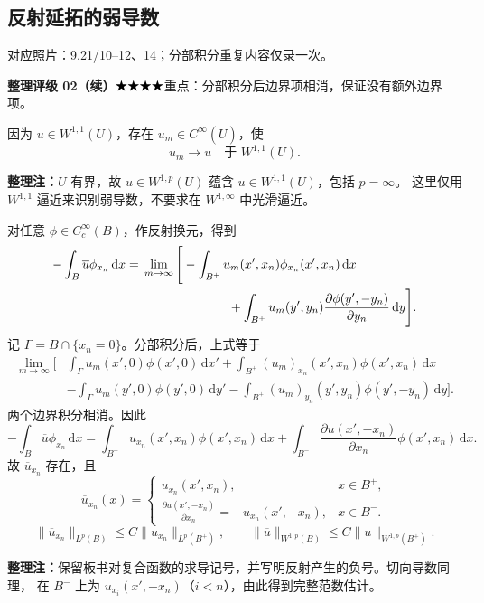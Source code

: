 \documentclass[UTF8,a4paper,11pt,fontset=fandol]{ctexart}
\newcommand{\dd}{\,\mathrm d}
\newcommand{\ednote}[1]{\par{\small\color{notegray}\textbf{整理注：}#1}\par}
\newcommand{\source}[1]{{\small\color{notegray}对应照片：#1。}\par}
\newcommand{\proofstars}[1]{\ensuremath{%
\ifnum#1>0\relax\bigstar\fi
\ifnum#1>1\relax\bigstar\fi
\ifnum#1>2\relax\bigstar\fi
\ifnum#1>3\relax\bigstar\fi
\ifnum#1>4\relax\bigstar\fi}}
\newcommand{\proofrating}[3]{\par{\small\color{proofblue}%
\textbf{整理评级 #1}\enspace\proofstars{#2}\quad #3\par}}
\begin{document}
\subsection*{反射延拓的弱导数}
\source{9.21/10--12、14；分部积分重复内容仅录一次}
\proofrating{02（续）}{4}{重点：分部积分后边界项相消，保证没有额外边界项。}
因为 $u\in W^{1,1}(U)$，存在 $u_m\in C^\infty(\overline U)$，使
\[
u_m\longrightarrow u\quad\text{于 }W^{1,1}(U).
\]
\ednote{$U$ 有界，故 $u\in W^{1,p}(U)$ 蕴含 $u\in W^{1,1}(U)$，包括 $p=\infty$。
这里仅用 $W^{1,1}$ 逼近来识别弱导数，不要求在 $W^{1,\infty}$ 中光滑逼近。}
对任意 $\phi\in C_c^\infty(B)$，作反射换元，得到
\[
\begin{aligned}
-\int_B\overline u\phi_{x_n}\dd x
={}&\lim_{m\to\infty}\Bigg[
-\int_{B^+}u_m(x',x_n)\phi_{x_n}(x',x_n)\dd x\\
&\hspace{24mm}+\int_{B^+}u_m(y',y_n)
\frac{\partial\phi(y',-y_n)}{\partial y_n}\dd y\Bigg].
\end{aligned}
\]
记 $\Gamma=B\cap\{x_n=0\}$。分部积分后，上式等于
\[
\begin{aligned}
\lim_{m\to\infty}\Bigg[{}
&\int_\Gamma u_m(x',0)\phi(x',0)\dd x'
+\int_{B^+}(u_m)_{x_n}(x',x_n)\phi(x',x_n)\dd x\\
&-\int_\Gamma u_m(y',0)\phi(y',0)\dd y'
-\int_{B^+}(u_m)_{y_n}(y',y_n)\phi(y',-y_n)\dd y\Bigg].
\end{aligned}
\]
两个边界积分相消。因此
\[
-\int_B\overline u\phi_{x_n}\dd x
=\int_{B^+}u_{x_n}(x',x_n)\phi(x',x_n)\dd x
+\int_{B^-}\frac{\partial u(x',-x_n)}{\partial x_n}\phi(x',x_n)\dd x.
\]
故 $\overline u_{x_n}$ 存在，且
\[
\overline u_{x_n}(x)=\begin{cases}
u_{x_n}(x',x_n),&x\in B^+,\\
\displaystyle\frac{\partial u(x',-x_n)}{\partial x_n}
=-u_{x_n}(x',-x_n),&x\in B^-.
\end{cases}
\]
\[
\|\overline u_{x_n}\|_{L^p(B)}\leq C\|u_{x_n}\|_{L^p(B^+)},
\qquad
\boxed{\|\overline u\|_{W^{1,p}(B)}\leq C\|u\|_{W^{1,p}(B^+)}.}
\]
\ednote{保留板书对复合函数的求导记号，并写明反射产生的负号。切向导数同理，
在 $B^-$ 上为 $u_{x_i}(x',-x_n)$（$i<n$），由此得到完整范数估计。}

\newpage
\end{document}
